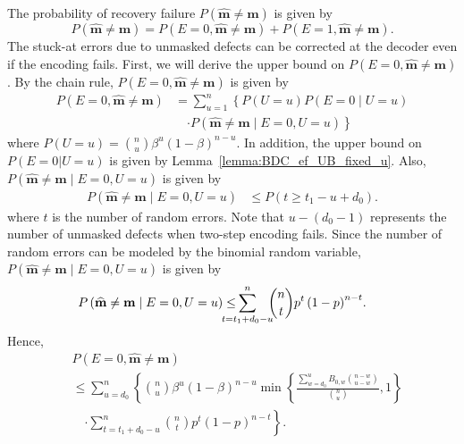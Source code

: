 \documentclass[10pt,twocolumn,twoside,submit]{JCNtran}
\begin{document}
	The probability of recovery failure $P\left( \widehat{\mathbf{m}} \ne \mathbf{m} \right)$ is given by
	\begin{equation*}
		P\left( \widehat{\mathbf{m}} \ne {\mathbf{m}} \right) = P(E=0, \widehat{\mathbf{m}} \ne {\mathbf{m}}) + P(E=1, \widehat{\mathbf{m}} \ne \mathbf{m}).
	\end{equation*}
	The stuck-at errors due to unmasked defects can be corrected at the decoder even if the encoding fails. First, we will derive the upper bound on $P(E=0, \widehat{\mathbf{m}} \ne \mathbf{m})$. By the chain rule, $P(E=0, \widehat{\mathbf{m}} \ne \mathbf{m})$ is given by
	\begin{align}
	{P(E=0, \widehat{\mathbf{m}} \ne \mathbf{m})} &= \sum_{u=1}^{n} { \left\{ P(U=u) P(E=0 \mid U=u)  \right. } \nonumber \\
	& \quad \left. \cdot	{P(\widehat{\mathbf{m}} \ne {\mathbf{m}} \mid E=0,U=u)} \right\} \nonumber
	\end{align}
	where $P(U=u) = \binom{n}{u} \beta^{u} \left( 1 - \beta \right)^{n-u}$. In addition, the upper bound on $P(E=0 |U=u)$ is given by Lemma~\ref{lemma:BDC_ef_UB_fixed_u}. Also, $P(\widehat{\mathbf{m}} \ne {\mathbf{m}} \mid E=0, U=u)$ is given by
	\begin{align}
		{P(\widehat{\mathbf{m}} \ne {\mathbf{m}} \mid E=0, U=u)} &\le P\left( t \ge t_1 - u + d_0 \right). \label{eq:P_D0E0Uu1}
	\end{align}
	where $t$ is the number of random errors. Note that $u - \left( d_0 - 1 \right)$ represents the number of unmasked defects when two-step encoding fails. Since the number of random errors can be modeled by the binomial random variable, $P(\widehat{\mathbf{m}} \ne {\mathbf{m}} \mid E=0, U=u)$ is given by
	\begin{align}
	\hspace{-2mm}P\left( \widehat{\mathbf{m}} \ne {\mathbf{m}} \mid E=0, U=u  \right) 
	&\le \hspace{-5mm} \sum_{t=t_1 + d_0 - u}^{n}\hspace{-2mm}{\binom{n}{t} p^{t} \left( 1 - p \right)^{n-t}}. 
	\end{align}
	Hence, %
	\begin{align}
		&P(E=0, \widehat{\mathbf{m}} \ne {\mathbf{m}}) \nonumber \\
		& \le \sum_{u=d_0}^{n} \left\{ \binom{n}{u} {\beta^{u} \left( 1 - \beta \right)^{n-u}} {\min \left\{ \frac{\sum_{w=d_0}^{u}{B_{0,w} \binom{n-w}{u-w}}}{\binom{n}{u}} , 1\right\}} \right. \nonumber \\
		&\quad\left. \cdot \sum_{t=t_1 + d_0 - u}^{n}{\binom{n}{t} p^{t} \left( 1 - p \right)^{n-t}} \right\}.
	\end{align}
	
\end{document}
